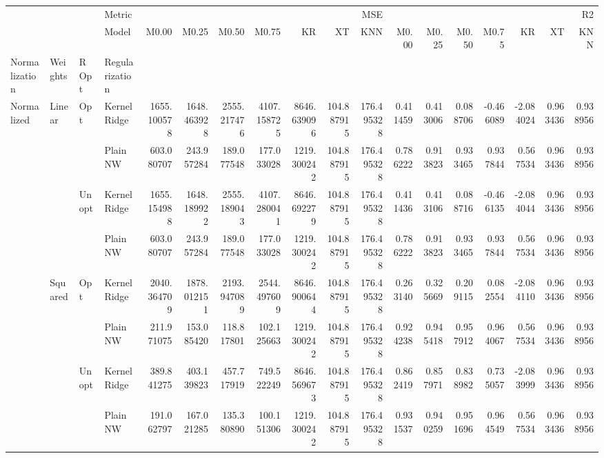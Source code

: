 \begin{tabular}{llllrrrrrrrrrrrrrr}
\toprule
 &  &  & Metric & \multicolumn{7}{r}{MSE} & \multicolumn{7}{r}{R2} \\
 &  &  & Model & M0.00 & M0.25 & M0.50 & M0.75 & KR & XT & KNN & M0.00 & M0.25 & M0.50 & M0.75 & KR & XT & KNN \\
Normalization & Weights & R Opt & Regularization &  &  &  &  &  &  &  &  &  &  &  &  &  &  \\
\midrule
\multirow[t]{8}{*}{Normalized} & \multirow[t]{4}{*}{Linear} & \multirow[t]{2}{*}{Opt} & KernelRidge & 1655.100578 & 1648.463928 & 2555.217476 & 4107.158725 & 8646.639096 & 104.887915 & 176.495328 & 0.411459 & 0.413006 & 0.088706 & -0.466089 & -2.084024 & 0.963436 & 0.938956 \\
 &  &  & Plain NW & 603.080707 & 243.957284 & 189.077548 & 177.033028 & 1219.300242 & 104.887915 & 176.495328 & 0.786222 & 0.913823 & 0.933465 & 0.937844 & 0.567534 & 0.963436 & 0.938956 \\
\cline{3-18}
 &  & \multirow[t]{2}{*}{Unopt} & KernelRidge & 1655.154988 & 1648.189922 & 2555.189043 & 4107.280041 & 8646.692279 & 104.887915 & 176.495328 & 0.411436 & 0.413106 & 0.088716 & -0.466135 & -2.084044 & 0.963436 & 0.938956 \\
 &  &  & Plain NW & 603.080707 & 243.957284 & 189.077548 & 177.033028 & 1219.300242 & 104.887915 & 176.495328 & 0.786222 & 0.913823 & 0.933465 & 0.937844 & 0.567534 & 0.963436 & 0.938956 \\
\cline{2-18} \cline{3-18}
 & \multirow[t]{4}{*}{Squared} & \multirow[t]{2}{*}{Opt} & KernelRidge & 2040.364709 & 1878.012151 & 2193.947089 & 2544.497609 & 8646.900644 & 104.887915 & 176.495328 & 0.263140 & 0.325669 & 0.209115 & 0.082554 & -2.084110 & 0.963436 & 0.938956 \\
 &  &  & Plain NW & 211.971075 & 153.085420 & 118.817801 & 102.125663 & 1219.300242 & 104.887915 & 176.495328 & 0.924238 & 0.945418 & 0.957912 & 0.964067 & 0.567534 & 0.963436 & 0.938956 \\
\cline{3-18}
 &  & \multirow[t]{2}{*}{Unopt} & KernelRidge & 389.841275 & 403.139823 & 457.717919 & 749.522249 & 8646.569673 & 104.887915 & 176.495328 & 0.862419 & 0.857971 & 0.838982 & 0.735057 & -2.083999 & 0.963436 & 0.938956 \\
 &  &  & Plain NW & 191.062797 & 167.021285 & 135.380890 & 100.151306 & 1219.300242 & 104.887915 & 176.495328 & 0.931537 & 0.940259 & 0.951696 & 0.964549 & 0.567534 & 0.963436 & 0.938956 \\
\cline{1-18} \cline{2-18} \cline{3-18}
\bottomrule
\end{tabular}
